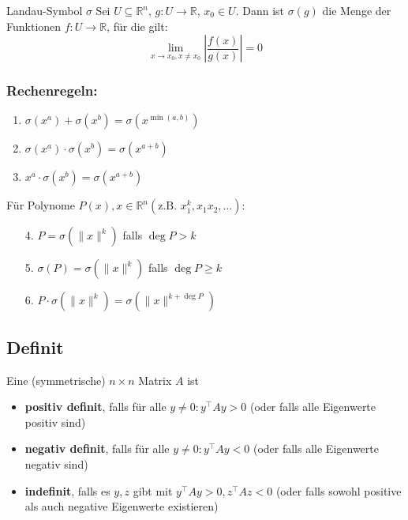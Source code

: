 \documentclass[a4paper,10pt]{article}
\begin{document}
\begin{mainbox}{Landau-Symbol $\sigma$}
    Sei $U \subseteq \mathbb{R}^{n}$, $g: U\to \mathbb{R}$, $x_{0} \in U$. Dann ist $\sigma(g)$ die Menge der Funktionen $f:U\to \mathbb{R}$, für die gilt:
    $$\lim_{ x \to x_{0}, x\neq x_{0} } \left|\frac{f(x)}{g(x)}\right|=0$$
\end{mainbox}

\subsubsection*{Rechenregeln:}
\begin{enumerate}
    \item $\sigma(x^{a})+\sigma(x^{b})=\sigma(x^{\min(a,b)})$
    \item $\sigma(x^{a})\cdot\sigma(x^{b})=\sigma(x^{a+b})$
    \item $x^{a}\cdot\sigma(x^{b})=\sigma(x^{a+b})$
\end{enumerate}

Für Polynome $P(x),x \in \mathbb{R}^{n} (\text{z.B. } x_{1}^{k},x_{1}x_{2},\dots)$:
\begin{enumerate}
    \item[4.] $P=\sigma(\|x\|^{k})$ falls $\deg P > k$
    \item[5.] $\sigma(P)=\sigma(\|x\|^{k})$ falls $\deg P \geq k$
    \item[6.] $P\cdot\sigma(\|x\|^{k})=\sigma(\|x\|^{k+\deg P})$
\end{enumerate}


\subsection{Definit}
Eine (symmetrische) $n\times n$ Matrix $A$ ist
\begin{itemize}
    \item \textbf{positiv definit}, falls für alle $y\neq 0: y^{\top}Ay>0$ (oder falls alle Eigenwerte positiv sind)
    \item \textbf{negativ definit}, falls für alle $y\neq 0: y^{\top}Ay<0$ (oder falls alle Eigenwerte negativ sind)
    \item \textbf{indefinit}, falls es $y,z$ gibt mit $y^{\top}Ay>0, z^{\top}Az<0$ (oder falls sowohl positive als auch negative Eigenwerte existieren)
\end{itemize}
\end{document}
